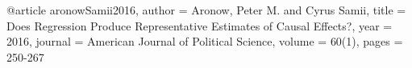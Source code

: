 @article{
  aronowSamii2016,
  author = {Aronow, Peter M. and Cyrus Samii},
  title = {Does Regression Produce Representative Estimates of Causal Effects?},
  year = {2016},
  journal = {American Journal of Political Science},
  volume = {60(1)},
  pages = {250-267}
}